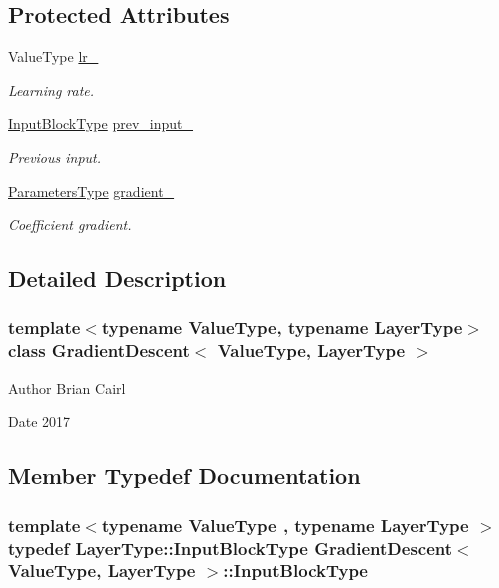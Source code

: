 \subsection*{Protected Attributes}
\begin{DoxyCompactItemize}
\item 
Value\-Type \hyperlink{class_gradient_descent_ad30dfe9d565d302f7fedde8f8091ac75}{lr\-\_\-}
\begin{DoxyCompactList}\small\item\em Learning rate. \end{DoxyCompactList}\item 
\hyperlink{class_gradient_descent_ac722ab757e64bce7c56067de83cb02db}{Input\-Block\-Type} \hyperlink{class_gradient_descent_aaf7ea2e806c9f55fb8644667583f27ff}{prev\-\_\-input\-\_\-}
\begin{DoxyCompactList}\small\item\em Previous input. \end{DoxyCompactList}\item 
\hyperlink{class_gradient_descent_a4fad1eabbf046df49564b647df175d3d}{Parameters\-Type} \hyperlink{class_gradient_descent_a552169cc01e9c6222da57190797aa32f}{gradient\-\_\-}
\begin{DoxyCompactList}\small\item\em Coefficient gradient. \end{DoxyCompactList}\end{DoxyCompactItemize}


\subsection{Detailed Description}
\subsubsection*{template$<$typename Value\-Type, typename Layer\-Type$>$class Gradient\-Descent$<$ Value\-Type, Layer\-Type $>$}

\begin{DoxyAuthor}{Author}
Brian Cairl 
\end{DoxyAuthor}
\begin{DoxyDate}{Date}
2017 
\end{DoxyDate}


\subsection{Member Typedef Documentation}
\hypertarget{class_gradient_descent_ac722ab757e64bce7c56067de83cb02db}{
\subsubsection[{Input\-Block\-Type}]{\setlength{\rightskip}{0pt plus 5cm}template$<$typename Value\-Type , typename Layer\-Type $>$ typedef Layer\-Type\-::\-Input\-Block\-Type {\bf Gradient\-Descent}$<$ Value\-Type, Layer\-Type $>$\-::{\bf Input\-Block\-Type}}}\label{class_gradient_descent_ac722ab757e64bce7c56067de83cb02db}


